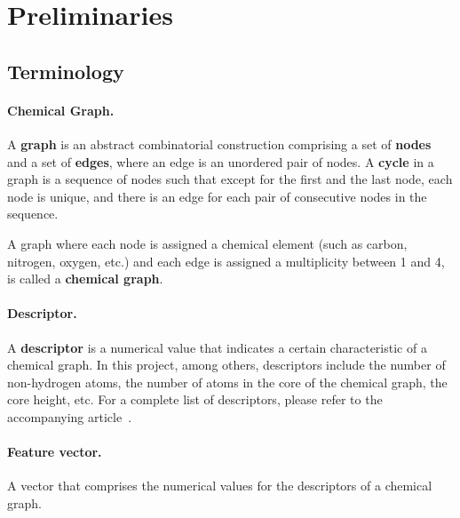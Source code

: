 \documentclass[11pt,titlepage,dvipdfmx,twoside]{book}
\begin{document}
\section{Preliminaries}
\label{sec:preparation}

\subsection{Terminology}
\paragraph{Chemical Graph.}
A {\bf graph} is an abstract combinatorial construction
comprising a set of {\bf nodes} and a set of {\bf edges},
where an edge is an unordered pair of nodes.
A {\bf cycle} in a graph is a sequence of
nodes such that except for the first and the last node,
each node is unique, and there is an edge for each pair of consecutive 
nodes in the sequence.

A graph where each node is assigned a chemical element
(such as carbon, nitrogen, oxygen, etc.) and each
edge is assigned a multiplicity between 1 and 4,
is called a {\bf chemical graph}.


\paragraph{Descriptor.}
A {\bf descriptor} is a numerical value that 
indicates a certain characteristic of a chemical graph.
In this project, among others, descriptors include
the number of non-hydrogen atoms, the number of atoms in the core of the 
chemical graph, the core height, etc.
For a complete list of descriptors, please refer to the 
accompanying article~\cite{AN20}.


\paragraph{Feature vector.}
A vector that comprises the numerical values for
the descriptors of a chemical graph.
\end{document}
